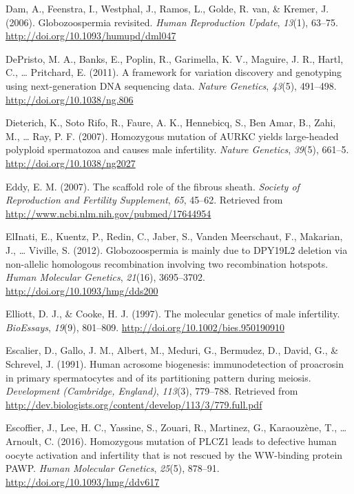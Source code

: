 \documentclass[12pt,twoside]{reedthesis}
\theoremstyle{definition}
\theoremstyle{definition}
\theoremstyle{remark}
\begin{document}
  \hypertarget{ref-Dam2006}{}
  Dam, A., Feenstra, I., Westphal, J., Ramos, L., Golde, R. van, \&
  Kremer, J. (2006). Globozoospermia revisited. \emph{Human Reproduction
  Update}, \emph{13}(1), 63--75.
  \url{http://doi.org/10.1093/humupd/dml047}
  
  \hypertarget{ref-DePristo2011}{}
  DePristo, M. A., Banks, E., Poplin, R., Garimella, K. V., Maguire, J.
  R., Hartl, C., \ldots{} Pritchard, E. (2011). A framework for variation
  discovery and genotyping using next-generation DNA sequencing data.
  \emph{Nature Genetics}, \emph{43}(5), 491--498.
  \url{http://doi.org/10.1038/ng.806}
  
  \hypertarget{ref-Dieterich2007}{}
  Dieterich, K., Soto Rifo, R., Faure, A. K., Hennebicq, S., Ben Amar, B.,
  Zahi, M., \ldots{} Ray, P. F. (2007). Homozygous mutation of AURKC
  yields large-headed polyploid spermatozoa and causes male infertility.
  \emph{Nature Genetics}, \emph{39}(5), 661--5.
  \url{http://doi.org/10.1038/ng2027}
  
  \hypertarget{ref-Eddy2007}{}
  Eddy, E. M. (2007). The scaffold role of the fibrous sheath.
  \emph{Society of Reproduction and Fertility Supplement}, \emph{65},
  45--62. Retrieved from \url{http://www.ncbi.nlm.nih.gov/pubmed/17644954}
  
  \hypertarget{ref-ElInati2012}{}
  ElInati, E., Kuentz, P., Redin, C., Jaber, S., Vanden Meerschaut, F.,
  Makarian, J., \ldots{} Viville, S. (2012). Globozoospermia is mainly due
  to DPY19L2 deletion via non-allelic homologous recombination involving
  two recombination hotspots. \emph{Human Molecular Genetics},
  \emph{21}(16), 3695--3702. \url{http://doi.org/10.1093/hmg/dds200}
  
  \hypertarget{ref-Elliott1997}{}
  Elliott, D. J., \& Cooke, H. J. (1997). The molecular genetics of male
  infertility. \emph{BioEssays}, \emph{19}(9), 801--809.
  \url{http://doi.org/10.1002/bies.950190910}
  
  \hypertarget{ref-Escalier1991}{}
  Escalier, D., Gallo, J. M., Albert, M., Meduri, G., Bermudez, D., David,
  G., \& Schrevel, J. (1991). Human acrosome biogenesis: immunodetection
  of proacrosin in primary spermatocytes and of its partitioning pattern
  during meiosis. \emph{Development (Cambridge, England)}, \emph{113}(3),
  779--788. Retrieved from
  \url{http://dev.biologists.org/content/develop/113/3/779.full.pdf}
  
  \hypertarget{ref-Escoffier2016}{}
  Escoffier, J., Lee, H. C., Yassine, S., Zouari, R., Martinez, G.,
  Karaouzène, T., \ldots{} Arnoult, C. (2016). Homozygous mutation of
  PLCZ1 leads to defective human oocyte activation and infertility that is
  not rescued by the WW-binding protein PAWP. \emph{Human Molecular
  Genetics}, \emph{25}(5), 878--91.
  \url{http://doi.org/10.1093/hmg/ddv617}
  
\end{document}
